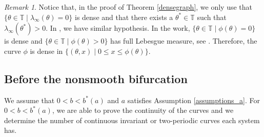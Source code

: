 \documentclass[12pt]{article}
\newcommand{\T}{\mathbb{T}}
\theoremstyle{plain}
\theoremstyle{remark}
\newtheorem{remark}[defn]{Remark}
\theoremstyle{definition}
\begin{document}
\begin{remark}\label{keller_remark}
    Notice that, in the proof of Theorem \ref{densegraph}, we only use that $\{\theta\in\T\mid\lambda_\infty(\theta)=0\}$ is dense and that there exists a $\theta^*\in\T$ such that $\lambda_\infty(\theta^*)>0$. In \cite{keller1996sna}, we have similar hypothesis. In the work, $\{\theta\in\T\mid\phi(\theta)=0\}$ is dense and $\{\theta\in\T\mid\phi(\theta)>0\}$ has full Lebesgue measure, see \cite[Theorem 1(3)]{keller1996sna}. Therefore, the curve $\phi$ is dense in $\{(\theta,x)\mid0\leq x\leq\phi(\theta)\}$.
\end{remark}

\subsection{Before the nonsmooth bifurcation}\label{three_curves_secion}
We assume that $0<b<b^*(a)$ and $a$ satisfies Assumption \eqref{assumptions_a}. For $0<b<b^*(a)$, we are able to prove the continuity of the curves and we determine the number of continuous invariant or two-periodic curves each system has.
\end{document}
